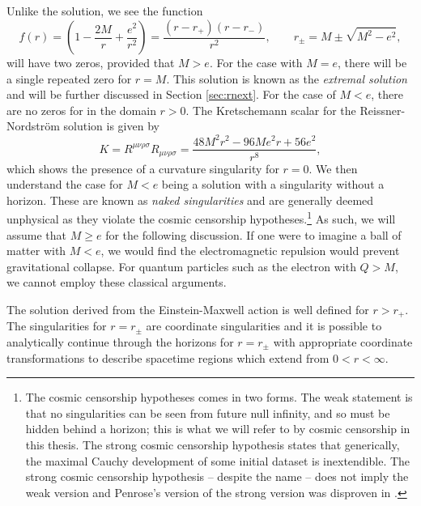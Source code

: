 Unlike the \sch solution, we see the function
\begin{equation}
\label{eq:rnzeros}
	f(r) = \left( 1 - \frac{2M}{r} + \frac{e^2}{r^2} \right) = \frac{(r - r_+)(r - r_-)}{r^2}, \qquad r_{\pm} = M \pm \sqrt{M^2 - e^2},
\end{equation}
will have two zeros, provided that $M > e$. For the case with $M  = e$, there will be a single repeated zero for $r = M$. This solution is known as the \emph{extremal solution} and will be further discussed in Section \ref{sec:rnext}. For the case of $M < e$, there are no zeros for  in the domain $r > 0$. The Kretschemann scalar for the Reissner-Nordstr\"om solution is given by \cite{Henry:1999rm}
\begin{equation*}
	K = R^{\mu \nu \rho \sigma} R_{\mu \nu \rho \sigma} = \frac{48M^2 r^2 - 96 M e^2 r+ 56 e^2}{r^8},
\end{equation*} 
which shows the presence of a curvature singularity for $r = 0$. We then understand the case for $M < e$ being a solution with a singularity without a horizon. These are known as \emph{naked singularities} and are generally deemed unphysical as they violate the cosmic censorship hypotheses.\footnote{The cosmic censorship hypotheses comes in two forms. The weak statement is that no singularities can be seen from future null infinity, and so must be hidden behind a horizon; this is what we will refer to by cosmic censorship in this thesis. The strong cosmic censorship hypothesis states that generically, the maximal Cauchy development of some initial dataset is inextendible. The strong cosmic censorship hypothesis -- despite the name -- does not  imply the weak version and Penrose's version \cite{Penrose:1969pc} of the strong version was disproven in \cite{Dafermos:2017dbw}.} As such, we will assume that $M \geq e$ for the following discussion. If one were to imagine a ball of matter with $M < e$, we would find the electromagnetic repulsion would prevent gravitational collapse. For quantum particles such as the electron with $Q > M$, we cannot employ these classical arguments.

The solution  derived from the Einstein-Maxwell action is well defined for $r > r_+$. The singularities for $r = r_\pm$ are coordinate singularities and it is possible to analytically continue through the horizons for $r = r_\pm$ with appropriate coordinate transformations to describe spacetime regions which extend from $0 < r < \infty$. 

